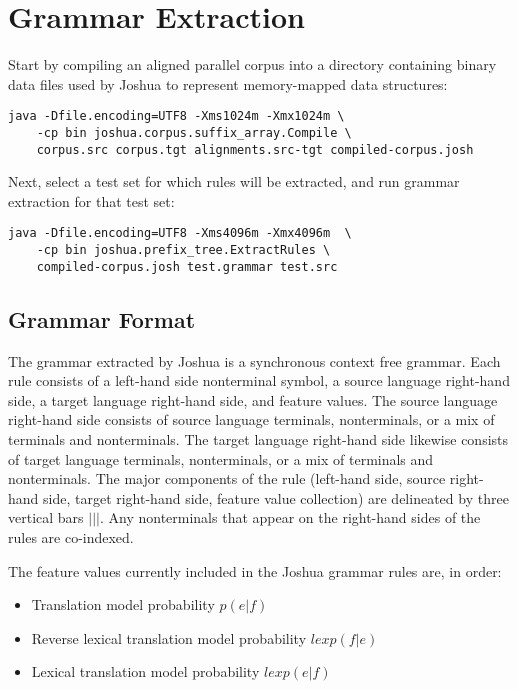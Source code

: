 \chapter{Grammar Extraction}
\label{ch:grammar-extraction}

Start by compiling an aligned parallel corpus into a directory containing binary data files used by Joshua to represent memory-mapped data structures:

\begin{verbatim}
java -Dfile.encoding=UTF8 -Xms1024m -Xmx1024m \
    -cp bin joshua.corpus.suffix_array.Compile \
    corpus.src corpus.tgt alignments.src-tgt compiled-corpus.josh
\end{verbatim}

Next, select a test set for which rules will be extracted, and run grammar extraction for that test set:

\begin{verbatim}
java -Dfile.encoding=UTF8 -Xms4096m -Xmx4096m  \
    -cp bin joshua.prefix_tree.ExtractRules \
    compiled-corpus.josh test.grammar test.src
\end{verbatim}


\section{Grammar Format}

The grammar extracted by Joshua is a synchronous context free grammar. Each rule consists of a left-hand side nonterminal symbol, a source language right-hand side, a target language right-hand side, and feature values. The source language right-hand side consists of source language terminals, nonterminals, or a mix of terminals and nonterminals. The target language right-hand side likewise consists of target language terminals, nonterminals, or a mix of terminals and nonterminals. The major components of the rule (left-hand side, source right-hand side, target right-hand side, feature value collection) are delineated by three vertical bars $|||$. Any nonterminals that appear on the right-hand sides of the rules are co-indexed.

The feature values currently included in the Joshua grammar rules are, in order:

  \begin{itemize}
  \item Translation model probability $p(e|f)$
  \item Reverse lexical translation model probability $lex p(f|e)$
  \item Lexical translation model probability $lex p(e|f)$
  \end{itemize}

